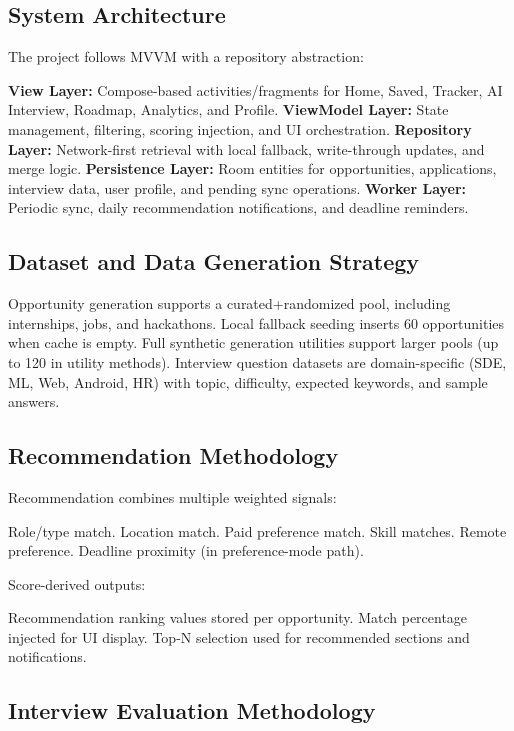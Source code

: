 \documentclass[conference]{IEEEtran}
\begin{document}
\subsection{System Architecture}

The project follows MVVM with a repository abstraction:

\textbf{View Layer:} Compose-based activities/fragments for Home, Saved, Tracker, AI Interview, Roadmap, Analytics, and Profile. \textbf{ViewModel Layer:} State management, filtering, scoring injection, and UI orchestration. \textbf{Repository Layer:} Network-first retrieval with local fallback, write-through updates, and merge logic. \textbf{Persistence Layer:} Room entities for opportunities, applications, interview data, user profile, and pending sync operations. \textbf{Worker Layer:} Periodic sync, daily recommendation notifications, and deadline reminders.

\subsection{Dataset and Data Generation Strategy}

Opportunity generation supports a curated+randomized pool, including internships, jobs, and hackathons. Local fallback seeding inserts 60 opportunities when cache is empty. Full synthetic generation utilities support larger pools (up to 120 in utility methods). Interview question datasets are domain-specific (SDE, ML, Web, Android, HR) with topic, difficulty, expected keywords, and sample answers.

\subsection{Recommendation Methodology}

Recommendation combines multiple weighted signals:

Role/type match. Location match. Paid preference match. Skill matches. Remote preference. Deadline proximity (in preference-mode path).

Score-derived outputs:

Recommendation ranking values stored per opportunity. Match percentage injected for UI display. Top-N selection used for recommended sections and notifications.

\subsection{Interview Evaluation Methodology}
\end{document}
